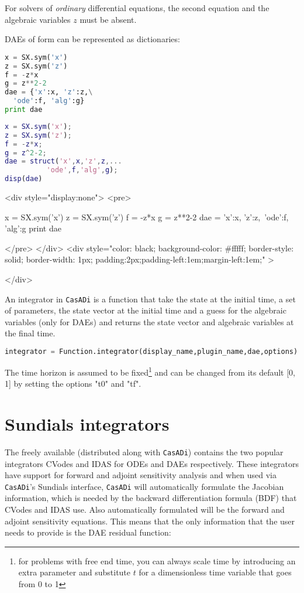 \documentclass[a4paper,12pt]{book}
\newcommand{\CasADi}{\texttt{CasADi}\xspace}
\newcounter{pytexcount}
\newcounter{pytexsubcount}
\renewenvironment{pytexoutput}
{\addtocounter{pytexsubcount}{1}%
\begin{rawhtml}
<div style="display:none">
<pre>
\end{rawhtml}
}%
{\begin{rawhtml}
</pre>
</div>
<div style="color: black; background-color: \#fffff;  border-style: solid; border-width: 1px; padding:2px;padding-left:1em;margin-left:1em;" >\end{rawhtml}%
\verbatiminputeval{pytex_\alph{pytexcount}_\arabic{pytexsubcount}.log}%
\begin{rawhtml}
</div>
\end{rawhtml}
}
\begin{document}
For solvers of \emph{ordinary} differential equations, the second equation and the algebraic variables $z$ must be absent.

DAEs of form can be represented as dictionaries:

\begin{minipage}[t]{0.5\textwidth}
\begin{lstlisting}[language=Python]
x = SX.sym('x')
z = SX.sym('z')
f = -z*x
g = z**2-2
dae = {'x':x, 'z':z,\
  'ode':f, 'alg':g}
print dae
\end{lstlisting}
\end{minipage}
\begin{minipage}[t]{0.5\textwidth}
\begin{lstlisting}[language=Matlab]
x = SX.sym('x');
z = SX.sym('z');
f = -z*x;
g = z^2-2;
dae = struct('x',x,'z',z,...
          'ode',f,'alg',g);
disp(dae)
\end{lstlisting}
\end{minipage}
\begin{pytexoutput}
x = SX.sym('x')
z = SX.sym('z')
f = -z*x
g = z**2-2
dae = {'x':x, 'z':z,\
  'ode':f, 'alg':g}
print dae
\end{pytexoutput}

An integrator in \CasADi is a function that take the state at the initial time, a set of parameters, the state vector at the initial time and a guess for the algebraic variables (only for DAEs) and returns the state vector and algebraic variables at the final time.

\begin{lstlisting}[language=Python]
integrator = Function.integrator(display_name,plugin_name,dae,options)
\end{lstlisting}

The time horizon is assumed to be fixed\footnote{for problems with free end time, you can always scale time by introducing an extra parameter and substitute $t$ for a dimensionless time variable that goes from 0 to 1} and can be changed from its default [0, 1] by setting the options "t0" and "tf".

\section{Sundials integrators}
The freely available  (distributed along with \CasADi) contains the two popular integrators CVodes and IDAS for ODEs and DAEs respectively. These integrators have support for forward and adjoint sensitivity analysis and when used via \CasADi's Sundials interface, \CasADi will automatically formulate the Jacobian information, which is needed by the backward differentiation formula (BDF) that CVodes and IDAS use. Also automatically formulated will be the forward and adjoint sensitivity equations. This means that the only information that the user needs to provide is the DAE residual function:
\end{document}
